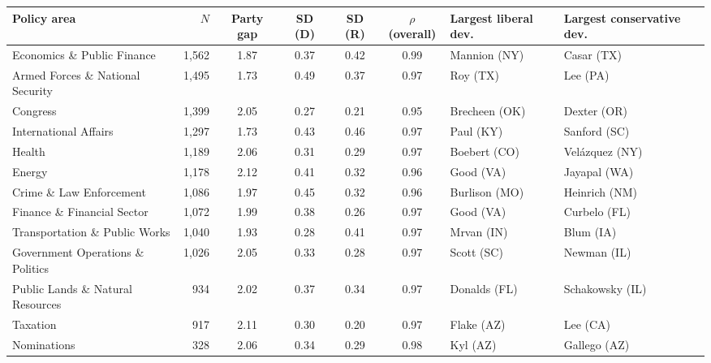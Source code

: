 \begin{tabular}{lrccccll}
\toprule
Policy area & $N$ & Party gap & SD (D) & SD (R) & $\rho$(overall) & Largest liberal dev. & Largest conservative dev. \\
\midrule
Economics \& Public Finance & 1,562 & 1.87 & 0.37 & 0.42 & 0.99 & Mannion (NY) & Casar (TX) \\
Armed Forces \& National Security & 1,495 & 1.73 & 0.49 & 0.37 & 0.97 & Roy (TX) & Lee (PA) \\
Congress & 1,399 & 2.05 & 0.27 & 0.21 & 0.95 & Brecheen (OK) & Dexter (OR) \\
International Affairs & 1,297 & 1.73 & 0.43 & 0.46 & 0.97 & Paul (KY) & Sanford (SC) \\
Health & 1,189 & 2.06 & 0.31 & 0.29 & 0.97 & Boebert (CO) & Velázquez (NY) \\
Energy & 1,178 & 2.12 & 0.41 & 0.32 & 0.96 & Good (VA) & Jayapal (WA) \\
Crime \& Law Enforcement & 1,086 & 1.97 & 0.45 & 0.32 & 0.96 & Burlison (MO) & Heinrich (NM) \\
Finance \& Financial Sector & 1,072 & 1.99 & 0.38 & 0.26 & 0.97 & Good (VA) & Curbelo (FL) \\
Transportation \& Public Works & 1,040 & 1.93 & 0.28 & 0.41 & 0.97 & Mrvan (IN) & Blum (IA) \\
Government Operations \& Politics & 1,026 & 2.05 & 0.33 & 0.28 & 0.97 & Scott (SC) & Newman (IL) \\
Public Lands \& Natural Resources & 934 & 2.02 & 0.37 & 0.34 & 0.97 & Donalds (FL) & Schakowsky (IL) \\
Taxation & 917 & 2.11 & 0.30 & 0.20 & 0.97 & Flake (AZ) & Lee (CA) \\
Nominations & 328 & 2.06 & 0.34 & 0.29 & 0.98 & Kyl (AZ) & Gallego (AZ) \\
\bottomrule
\end{tabular}
